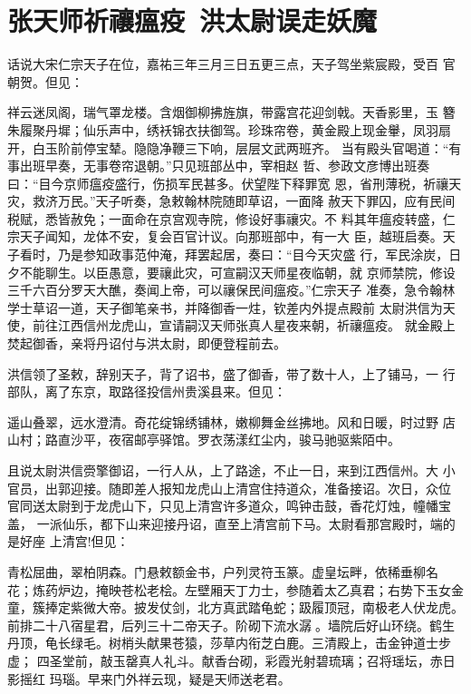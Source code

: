 \chapter{张天师祈禳瘟疫~洪太尉误走妖魔}

话说大宋仁宗天子在位，嘉祐三年三月三日五更三点，天子驾坐紫宸殿，受百
官朝贺。但见：

祥云迷凤阁，瑞气罩龙楼。含烟御柳拂旌旗，带露宫花迎剑戟。天香影里，玉
簪朱履聚丹墀；仙乐声中，绣袄锦衣扶御驾。珍珠帘卷，黄金殿上现金轝，凤羽扇
开，白玉阶前停宝辇。隐隐净鞭三下响，层层文武两班齐。
当有殿头官喝道：“有事出班早奏，无事卷帘退朝。”只见班部丛中，宰相赵
哲、参政文彦博出班奏曰：“目今京师瘟疫盛行，伤损军民甚多。伏望陛下释罪宽
恩，省刑薄税，祈禳天灾，救济万民。”天子听奏，急敕翰林院随即草诏，一面降
赦天下罪囚，应有民间税赋，悉皆赦免；一面命在京宫观寺院，修设好事禳灾。不
料其年瘟疫转盛，仁宗天子闻知，龙体不安，复会百官计议。向那班部中，有一大
臣，越班启奏。天子看时，乃是参知政事范仲淹，拜罢起居，奏曰：“目今天灾盛
行，军民涂炭，日夕不能聊生。以臣愚意，要禳此灾，可宣嗣汉天师星夜临朝，就
京师禁院，修设三千六百分罗天大醮，奏闻上帝，可以禳保民间瘟疫。”仁宗天子
准奏，急令翰林学士草诏一道，天子御笔亲书，并降御香一炷，钦差内外提点殿前
太尉洪信为天使，前往江西信州龙虎山，宣请嗣汉天师张真人星夜来朝，祈禳瘟疫。
就金殿上焚起御香，亲将丹诏付与洪太尉，即便登程前去。

洪信领了圣敕，辞别天子，背了诏书，盛了御香，带了数十人，上了铺马，一
行部队，离了东京，取路径投信州贵溪县来。但见：

遥山叠翠，远水澄清。奇花绽锦绣铺林，嫩柳舞金丝拂地。风和日暖，时过野
店山村；路直沙平，夜宿邮亭驿馆。罗衣荡漾红尘内，骏马驰驱紫陌中。

且说太尉洪信赍擎御诏，一行人从，上了路途，不止一日，来到江西信州。大
小官员，出郭迎接。随即差人报知龙虎山上清宫住持道众，准备接诏。次日，众位
官同送太尉到于龙虎山下，只见上清宫许多道众，鸣钟击鼓，香花灯烛，幢幡宝盖，
一派仙乐，都下山来迎接丹诏，直至上清宫前下马。太尉看那宫殿时，端的是好座
上清宫!但见：

青松屈曲，翠柏阴森。门悬敕额金书，户列灵符玉篆。虚皇坛畔，依稀垂柳名
花；炼药炉边，掩映苍松老桧。左壁厢天丁力士，参随着太乙真君；右势下玉女金
童，簇捧定紫微大帝。披发仗剑，北方真武踏龟蛇；趿履顶冠，南极老人伏龙虎。
前排二十八宿星君，后列三十二帝天子。阶砌下流水潺。墙院后好山环绕。鹤生
丹顶，龟长绿毛。树梢头献果苍猿，莎草内衔芝白鹿。三清殿上，击金钟道士步虚；
四圣堂前，敲玉罄真人礼斗。献香台砌，彩霞光射碧琉璃；召将瑶坛，赤日影摇红
玛瑙。早来门外祥云现，疑是天师送老君。

